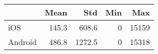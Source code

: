 \begin{tabular}{lrrrr}
\hline
         &   Mean &    Std &   Min &   Max \\
\hline
 iOS     &  145.3 &  608.6 &     0 & 15159 \\
 Android &  486.8 & 1272.5 &     0 & 15318 \\
\hline
\end{tabular}